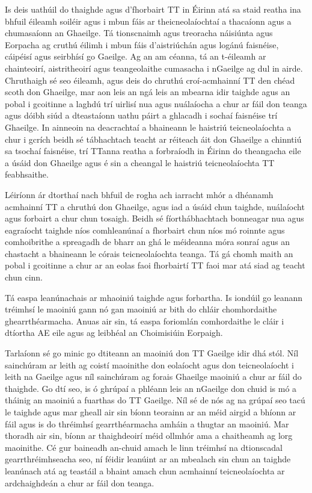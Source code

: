 \begin{multicols}{2}
Is deis uathúil do thaighde agus d’fhorbairt TT in Éirinn atá sa staid reatha ina bhfuil éileamh soiléir agus i mbun fáis ar theicneolaíochtaí a thacaíonn agus a chumasaíonn an Ghaeilge. Tá tionscnaimh agus treoracha náisiúnta agus Eorpacha ag cruthú éilimh i mbun fáis d’aistriúchán agus logánú faisnéise, cáipéisí agus seirbhísí go Gaeilge. Ag an am céanna, tá an t-éileamh ar chainteoirí, aistritheoirí agus teangeolaithe cumasacha i nGaeilge ag dul in airde. Chruthaigh sé seo éileamh, agus deis do chruthú croí-acmhainní TT den chéad scoth don Ghaeilge, mar aon leis an ngá leis an mbearna idir taighde agus an pobal i gcoitinne a laghdú trí uirlisí nua agus nuálaíocha a chur ar fáil don teanga agus dóibh siúd a dteastaíonn uathu páirt a ghlacadh i sochaí faisnéise trí Ghaeilge. In ainneoin na deacrachtaí a bhaineann le haistriú teicneolaíochta a chur i gcrích beidh sé tábhachtach teacht ar réiteach áit don Ghaeilge a chinntiú sa tsochaí faisnéise, trí TTanna reatha a forbraíodh in Éirinn do theangacha eile a úsáid don Ghaeilge agus é sin a cheangal le haistriú teicneolaíochta TT feabhsaithe.

Léiríonn ár dtorthaí nach bhfuil de rogha ach iarracht mhór a dhéanamh acmhainní TT a chruthú don Ghaeilge, agus iad a úsáid chun taighde, nuálaíocht agus forbairt a chur chun tosaigh. Beidh sé fíorthábhachtach bonneagar nua agus eagraíocht taighde níos comhleanúnaí a fhorbairt chun níos mó roinnte agus comhoibrithe a spreagadh de bharr an ghá le méideanna móra sonraí agus an chastacht a bhaineann le córais teicneolaíochta teanga. Tá gá chomh maith an pobal i gcoitinne a chur ar an eolas faoi fhorbairtí TT faoi mar atá siad ag teacht chun cinn.

Tá easpa leanúnachais ar mhaoiniú taighde agus forbartha. Is iondúil go leanann tréimhsí le maoiniú gann nó gan maoiniú ar bith do chláir chomhordaithe ghearrthéarmacha. Anuas air sin, tá easpa foriomlán comhordaithe le cláir i dtíortha AE eile agus ag leibhéal an Choimisiúin Eorpaigh.

Tarlaíonn sé go minic go dtiteann an maoiniú don TT Gaeilge idir dhá stól. Níl sainchúram ar leith ag coistí maoinithe don eolaíocht agus don teicneolaíocht i leith na Gaeilge agus níl sainchúram ag forais Ghaeilge maoiniú a chur ar fáil do thaighde. Go dtí seo, is ó ghrúpaí a phléann leis an nGaeilge don chuid is mó a tháinig an maoiniú a fuarthas do TT Gaeilge. Níl sé de nós ag na grúpaí seo tacú le taighde agus mar gheall air sin bíonn teorainn ar an méid airgid a bhíonn ar fáil agus is do thréimhsí gearrthéarmacha amháin a thugtar an maoiniú. Mar thoradh air sin, bíonn ar thaighdeoirí méid ollmhór ama a chaitheamh ag lorg maoinithe. Cé gur baineadh an-chuid amach le linn tréimhsí na dtionscadal gearrthréimhseacha seo, ní féidir leanúint ar an mbealach sin chun an taighde leanúnach atá ag teastáil a bhaint amach chun acmhainní teicneolaíochta ar ardchaighdeán a chur ar fáil don teanga.


\end{multicols}
